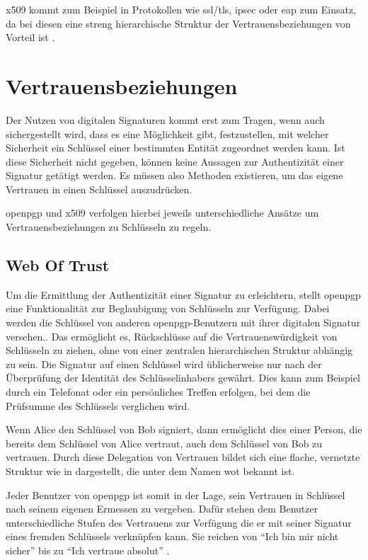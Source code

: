 \gls{x509} kommt zum Beispiel in Protokollen wie \gls{ssl}/\gls{tls}, \gls{ipsec} oder \gls{eap} zum Einsatz, da bei diesen eine streng hierarchische Struktur
der Vertrauensbeziehungen von Vorteil ist \cite{kits,tls:ietf}.

\section{Vertrauensbeziehungen}
Der Nutzen von digitalen Signaturen kommt erst zum Tragen, wenn auch sichergestellt wird, dass es eine Möglichkeit gibt, festzustellen, mit welcher Sicherheit
ein Schlüssel einer bestimmten Entität zugeordnet werden kann. Ist diese Sicherheit nicht gegeben, können keine Aussagen zur Authentizität einer Signatur
getätigt werden. Es müssen also Methoden existieren, um das eigene Vertrauen in einen Schlüssel auszudrücken.

\gls{openpgp} und \gls{x509} verfolgen hierbei jeweils unterschiedliche Ansätze um Vertrauensbeziehungen zu Schlüsseln zu regeln.

\subsection{Web Of Trust}
Um die Ermittlung der Authentizität einer Signatur zu erleichtern, stellt \gls{openpgp} eine Funktionalität zur Beglaubigung von Schlüsseln zur Verfügung. Dabei
werden die Schlüssel von anderen \gls{openpgp}-Benutzern mit ihrer digitalen Signatur versehen.. Das ermöglicht es, Rückschlüsse auf die Vertrauenswürdigkeit
von Schlüsseln zu ziehen, ohne von einer zentralen hierarchischen Struktur abhängig zu sein. Die Signatur auf einen Schlüssel wird üblicherweise nur nach der
Überprüfung der Identität des Schlüsselinhabers gewährt. Dies kann zum Beispiel durch ein Telefonat oder ein persönliches Treffen erfolgen, bei dem die
Prüfsumme des Schlüssels verglichen wird.  

Wenn Alice den Schlüssel von Bob signiert, dann ermöglicht dies einer Person, die bereits dem Schlüssel von Alice vertraut, auch dem Schlüssel von Bob zu
vertrauen. Durch diese Delegation von Vertrauen bildet sich eine flache, vernetzte Struktur wie in  dargestellt, die unter dem Namen \gls{wot}
bekannt ist. 

Jeder Benutzer von \gls{openpgp} ist somit in der Lage, sein Vertrauen in Schlüssel nach seinem eigenen Ermessen zu vergeben. Dafür stehen dem
Benutzer unterschiedliche Stufen des Vertrauens zur Verfügung die er mit seiner Signatur eines fremden Schlüssels verknüpfen kann. Sie reichen von "`Ich bin mir
nicht sicher"' bis zu "`Ich vertraue absolut"' \cite{pgp}.

